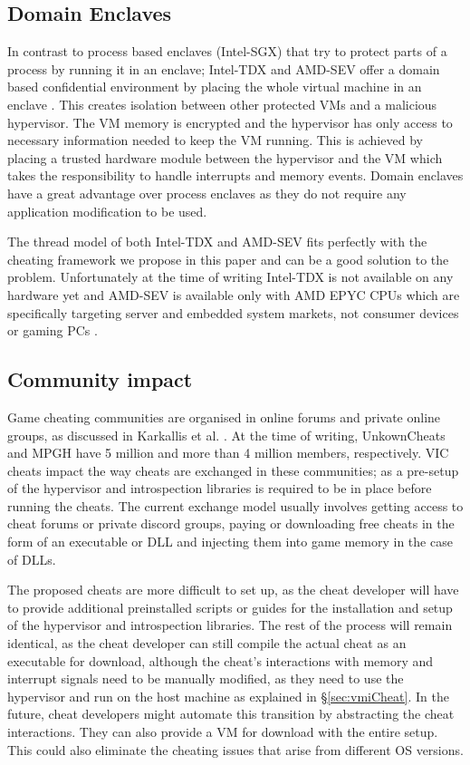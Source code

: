 \subsection{Domain Enclaves}

In contrast to process based enclaves (Intel-SGX) that try to protect parts of a process by running it in an enclave; Intel-TDX and AMD-SEV offer a domain based confidential environment by placing the whole virtual machine in an enclave \cite{IntelTDX}. This creates isolation between other protected VMs and a malicious hypervisor. The VM memory is encrypted and the hypervisor has only access to necessary information needed to keep the VM running. This is achieved by placing a trusted hardware module between the hypervisor and the VM which takes the responsibility to handle interrupts and memory events. Domain enclaves have a great advantage over process enclaves as they do not require any application modification to be used.

The thread model of both Intel-TDX and AMD-SEV fits perfectly with the cheating framework we propose in this paper and can be a good solution to the problem. Unfortunately at the time of writing Intel-TDX is not available on any hardware yet and AMD-SEV is available only with AMD EPYC CPUs which are specifically targeting server and embedded system markets, not consumer devices or gaming PCs \cite{AMD-SEV}.


\subsection{Community impact}
\label{sec:discusion:business_model}


Game cheating communities are organised in online forums and private online groups, as discussed in Karkallis et al. \cite{DetectingGameInjectors}. At the time of writing, UnkownCheats and MPGH have 5 million and more than 4 million members, respectively. VIC cheats impact the way cheats are exchanged in these communities; as a pre-setup of the hypervisor and introspection libraries is required to be in place before running the cheats. The current exchange model usually involves getting access to cheat forums or private discord groups, paying or downloading free cheats in the form of an executable or DLL and injecting them into game memory in the case of DLLs.

The proposed cheats are more difficult to set up, as the cheat developer will have to provide additional preinstalled scripts or guides for the installation and setup of the hypervisor and introspection libraries. The rest of the process will remain identical, as the cheat developer can still compile the actual cheat as an executable for download, although the cheat's interactions with memory and interrupt signals need to be manually modified, as they need to use the hypervisor and run on the host machine as explained in \S \ref{sec:vmiCheat}. In the future, cheat developers might automate this transition by abstracting the cheat interactions. They can also provide a VM for download with the entire setup. This could also eliminate the cheating issues that arise from different OS versions. 

